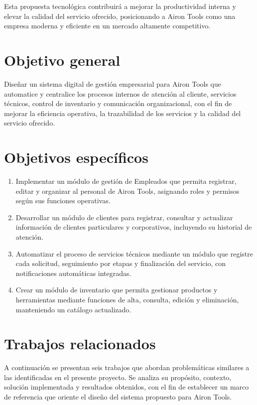 Esta propuesta tecnológica contribuirá a mejorar la productividad interna y elevar la calidad del servicio ofrecido, posicionando a Airon Tools como una empresa moderna y eficiente en un mercado altamente competitivo.

\section{Objetivo general}
Diseñar un sistema digital de gestión empresarial para Airon Tools que automatice y centralice los procesos internos de atención al cliente, servicios técnicos, control de inventario y comunicación organizacional, con el fin de mejorar la eficiencia operativa, la trazabilidad de los servicios y la calidad del servicio ofrecido.

\section{Objetivos específicos}
\begin{enumerate}
    \item Implementar un módulo de gestión de Empleados que permita registrar, editar y organizar al personal de Airon Tools, asignando roles y permisos según sus funciones operativas.

    \item Desarrollar un módulo de clientes para registrar, consultar y actualizar información de clientes particulares y corporativos, incluyendo su historial de atención.

    \item Automatizar el proceso de servicios técnicos mediante un módulo que registre cada solicitud, seguimiento por etapas y finalización del servicio, con notificaciones automáticas integradas.

    \item Crear un módulo de inventario que permita gestionar productos y herramientas mediante funciones de alta, consulta, edición y eliminación, manteniendo un catálogo actualizado.
\end{enumerate}


\section{Trabajos relacionados}

A continuación se presentan seis trabajos que abordan problemáticas similares a las identificadas en el presente proyecto. Se analiza su propósito, contexto, solución implementada y resultados obtenidos, con el fin de establecer un marco de referencia que oriente el diseño del sistema propuesto para Airon Tools.

